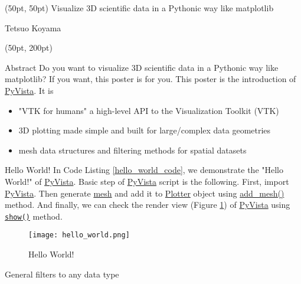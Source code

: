 \documentclass[final]{beamer}
\begin{document}
\begin{frame}[fragile]
\begin{textblock*}{3450pt}(50pt, 50pt)
\Huge Visualize 3D scientific data in a Pythonic way like matplotlib

\Large Tetsuo Koyama
\end{textblock*}

\begin{textblock*}{800pt}(50pt, 200pt)
\begin{block}{Abstract}
Do you want to visualize 3D scientific data in a Pythonic way like matplotlib?
If you want, this poster is for you.
This poster is the introduction of \href{https://pypi.org/project/pyvista/}{PyVista}.
It is
\begin{itemize}
\item "VTK for humans"\: a high-level API to the Visualization Toolkit (VTK)
\item 3D plotting made simple and built for large/complex data geometries
\item mesh data structures and filtering methods for spatial datasets
\end{itemize}

\end{block}
\begin{block}{Hello World!}
In Code Listing \ref{hello_world_code}, we demonstrate the "Hello World!" of \href{https://pypi.org/project/pyvista/}{PyVista}.
Basic step of \href{https://pypi.org/project/pyvista/}{PyVista} script is the following.
First, import \href{https://pypi.org/project/pyvista/}{PyVista}.
Then generate \href{https://docs.pyvista.org/getting-started/what-is-a-mesh.html}{mesh} and add it to
\href{https://docs.pyvista.org/plotting/plotting.html#pyvista.Plotter}{Plotter} object using \href{https://docs.pyvista.org/plotting/plotting.html#pyvista.BasePlotter.add\_mesh}{add\_mesh()} method.
And finally, we can check the render view (Figure \ref{HelloWorldFigure}) of \href{https://pypi.org/project/pyvista/}{PyVista} using \href{https://docs.pyvista.org/plotting/plotting.html#pyvista.Plotter.show}{\texttt{show()}} method.


\begin{figure}
\texttt{[image: hello\_world.png]}
\caption{Hello World!}\label{HelloWorldFigure}
\end{figure}
\end{block}
\begin{block}{General filters to any data type}


\end{block}
\end{textblock*}
\end{frame}
\end{document}
